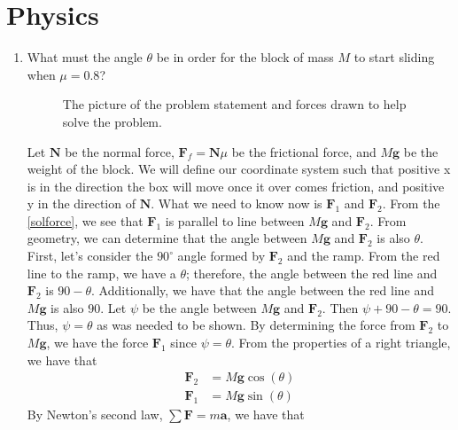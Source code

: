 \section{Physics}

\begin{enumerate}
\item
  What must the angle \(\theta\) be in order for the block of mass \(M\) to
  start sliding when \(\mu = 0.8\)?
  \begin{figure}[H]
    \centering
    \qquad
    \caption{The picture of the problem statement and forces drawn to help solve
      the problem.}
  \end{figure}
  Let \(\mathbf{N}\) be the normal force, \(\mathbf{F}_f = \mathbf{N}\mu\) be the
  frictional force, and \(M\mathbf{g}\) be the weight of the block.
  We will define our coordinate system such that positive x is in the direction
  the box will move once it over comes friction, and positive y in the direction
  of \(\mathbf{N}\).
  What we need to know now is \(\mathbf{F}_1\) and \(\mathbf{F}_2\).
  From the \cref{solforce}, we see that \(\mathbf{F}_1\) is parallel to line
  between \(M\mathbf{g}\) and \(\mathbf{F}_2\).
  From geometry, we can determine that the angle between \(M\mathbf{g}\) and
  \(\mathbf{F}_2\) is also \(\theta\).
  First, let's consider the \(90^{\circ}\) angle formed by \(\mathbf{F}_2\)
  and the ramp.
  From the red line to the ramp, we have a \(\theta\); therefore, the angle
  between the red line and \(\mathbf{F}_2\) is \(90 - \theta\).
  Additionally, we have that the angle between the red line and \(M\mathbf{g}\)
  is also \(90\).
  Let \(\psi\) be the angle between \(M\mathbf{g}\) and \(\mathbf{F}_2\).
  Then \(\psi + 90 - \theta = 90\).
  Thus, \(\psi = \theta\) as was needed to be shown.
  By determining the force from \(\mathbf{F}_2\) to \(M\mathbf{g}\), we have
  the force \(\mathbf{F}_1\) since \(\psi = \theta\).
  From the properties of a right triangle, we have that
  \begin{align*}
    \mathbf{F}_2 &= M\mathbf{g}\cos(\theta)\\
    \mathbf{F}_1 &= M\mathbf{g}\sin(\theta)
  \end{align*}
  By Newton's second law, \(\sum\mathbf{F} = m\mathbf{a}\), we have that
  \begin{subequations}

\end{subequations}
\end{enumerate}
